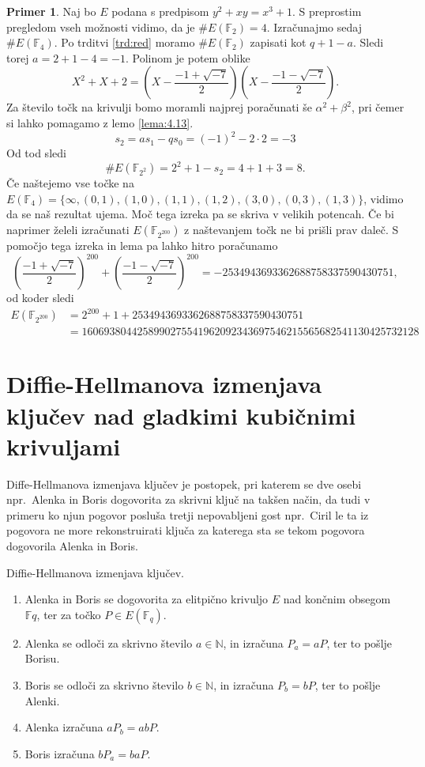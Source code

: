 \documentclass[12pt,a4paper,twoside]{article}
\theoremstyle{definition} %
\newtheorem{primer}[definicija]{Primer}
\theoremstyle{plain} %
\numberwithin{equation}{section}  %
\newcommand{\N}{\mathbb N}
\newcommand{\F}{\mathbb F}
\newcommand{\Fq}[1]{{\mathbb{F}_{#1}}}
\newcommand{\E}[1]{E({#1})}
\begin{document}
\begin{primer}
Naj bo $E$ podana s predpisom $y^2+xy = x^3+1$. S preprostim pregledom vseh možnosti vidimo, da je $\#\E{\F_2} = 4$. Izračunajmo sedaj $\#\E{\F_4}$. Po trditvi \ref{trd:red} moramo
$\#\E{\F_2}$ zapisati kot $q+1-a$. Sledi torej $a = 2+1-4 = -1$. Polinom je potem oblike
$$X^2+X+2 = (X-\frac{-1+\sqrt{-7}}{2}) (X-\frac{-1-\sqrt{-7}}{2}).$$
Za število točk na krivulji bomo moramli najprej poračunati še $\alpha^2+\beta^2$, pri čemer si lahko pomagamo z lemo \ref{lema:4.13}.
$$s_2 = as_1-qs_0 = (-1)^2-2\cdot2 = -3$$
Od tod sledi
$$\#\E{\F_{2^2}} = 2^2+1-s_2 = 4+1+3 = 8.$$
 Če naštejemo vse točke na $\E{\F_{4}} = \{ \infty,(0,1),(1,0),(1,1),(1,2),(3,0),(0,3),(1,3)\}$, vidimo da se naš rezultat ujema.
Moč tega izreka pa se skriva v velikih potencah. Če bi naprimer želeli izračunati
$\E{\F_{2^{200}}}$ z naštevanjem točk ne bi prišli prav daleč. S pomočjo tega izreka in lema pa lahko hitro poračunamo
$$(\frac{-1+\sqrt{-7}}{2})^{200}+ (\frac{-1-\sqrt{-7}}{2})^{200} = -2534943693362688758337590430751,$$
od koder sledi
\begin{align}
\E{\F_{2^{200}}} &{}= 2^{200} + 1 +2534943693362688758337590430751 \nonumber \\
&{}= 1606938044258990275541962092343697546215565682541130425732128 \nonumber
\end{align}
\end{primer}



\section{Diffie-Hellmanova izmenjava ključev nad gladkimi kubičnimi krivuljami}

Diffe-Hellmanova izmenjava ključev je postopek, pri katerem se dve osebi npr.\  Alenka in Boris dogovorita za skrivni ključ na takšen način, da tudi v primeru ko njun pogovor posluša tretji nepovabljeni gost npr.\  Ciril le ta iz pogovora ne more rekonstruirati ključa za katerega sta se tekom pogovora dogovorila Alenka in Boris. 
\begin{algorithm}[H]
\caption[Diffe-Hellman]{Diffie-Hellmanova izmenjava ključev.}
\label{alg:diffie-hellman}

\begin{enumerate}

\item Alenka in Boris se dogovorita za elitpično krivuljo $E$ nad končnim obsegom $\F{q}$, ter za točko $P \in \E{\Fq{q}}$.
\item Alenka se odloči za skrivno število $a \in \N$, in izračuna $P_a = aP$, ter to pošlje Borisu.
\item Boris se odloči za skrivno število $b \in \N$, in izračuna $P_b = bP$, ter to pošlje Alenki.
\item Alenka izračuna $aP_b=abP$.
\item Boris izračuna $bP_a=baP$.

\end{enumerate}
\end{algorithm}
\end{document}
